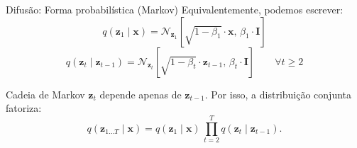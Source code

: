 \documentclass[aspectratio=169,xcolor=dvipsnames]{beamer}
\begin{document}
  \begin{frame}{Difusão: Forma probabilística (Markov)}
    Equivalentemente, podemos escrever:
    \vspace{0.3em}
    \[
      q(\mathbf{z}_1 \mid \mathbf{x}) = \mathcal{N}_{\mathbf{z}_1}\!\left[\sqrt{1 - \beta_1}\cdot \mathbf{x},\, \beta_1 \cdot \mathbf{I}\right]
    \]
    \[
      q(\mathbf{z}_t \mid \mathbf{z}_{t-1}) = \mathcal{N}_{\mathbf{z}_t}\!\left[\sqrt{1 - \beta_t}\cdot \mathbf{z}_{t-1},\, \beta_t \cdot \mathbf{I}\right]
      \qquad \forall t \geq 2
    \]
    \vspace{0.3em}
    \begin{block}{Cadeia de Markov}
      $\mathbf{z}_t$ depende apenas de $\mathbf{z}_{t-1}$. Por isso, a distribuição
      conjunta fatoriza:
      \[
        q(\mathbf{z}_{1\ldots T} \mid \mathbf{x}) = q(\mathbf{z}_1 \mid \mathbf{x})\, \prod_{t=2}^{T} q(\mathbf{z}_t \mid \mathbf{z}_{t-1}).
      \]
    \end{block}
  \end{frame}
\end{document}

